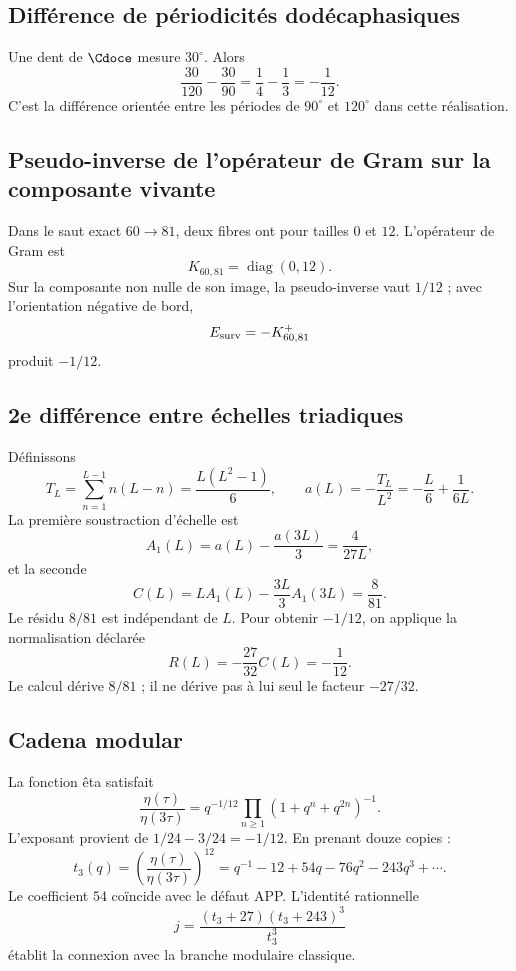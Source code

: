 \subsection{Différence de périodicités dodécaphasiques}

Une dent de \(\Cdoce\) mesure \(30^\circ\). Alors
\[
\frac{30}{120}-\frac{30}{90}
=\frac14-\frac13
=-\frac1{12}.
\]
C’est la différence orientée entre les périodes de \(90^\circ\) et
\(120^\circ\) dans cette réalisation.

\subsection{Pseudo-inverse de l’opérateur de Gram sur la composante vivante}

Dans le saut exact \(60\to81\), deux fibres ont pour tailles \(0\) et
\(12\). L’opérateur de Gram est
\[
K_{60,81}=\operatorname{diag}(0,12).
\]
Sur la composante non nulle de son image, la pseudo-inverse vaut \(1/12\) ; avec l’orientation
négative de bord,
\[
E_{\rm surv}=-K_{60,81}^{+}
\]
produit \(-1/12\).

\subsection{2e différence entre échelles triadiques}
\label{sec:c27-segunda-diferencia-triadica}

Définissons
\[
T_L=\sum_{n=1}^{L-1}n(L-n)=\frac{L(L^2-1)}6,
\qquad
a(L)=-\frac{T_L}{L^2}=-\frac L6+\frac1{6L}.
\]
La première soustraction d’échelle est
\[
A_1(L)=a(L)-\frac{a(3L)}3=\frac4{27L},
\]
et la seconde
\[
C(L)=LA_1(L)-\frac{3L}{3}A_1(3L)=\frac8{81}.
\]
Le résidu \(8/81\) est indépendant de \(L\). Pour obtenir
\(-1/12\), on applique la normalisation déclarée
\[
R(L)=-\frac{27}{32}C(L)=-\frac1{12}.
\]
Le calcul dérive \(8/81\) ; il ne dérive pas à lui seul le facteur \(-27/32\).

\subsection{Cadena modular}

La fonction êta satisfait
\[
\frac{\eta(\tau)}{\eta(3\tau)}
=q^{-1/12}\prod_{n\ge1}(1+q^n+q^{2n})^{-1}.
\]
L’exposant provient de \(1/24-3/24=-1/12\). En prenant douze copies :
\[
t_3(q)=\left(\frac{\eta(\tau)}{\eta(3\tau)}\right)^{12}
=q^{-1}-12+54q-76q^2-243q^3+\cdots.
\]
Le coefficient \(54\) coïncide avec le défaut APP\@. L’identité rationnelle
\[
j=\frac{(t_3+27)(t_3+243)^3}{t_3^3}
\]
établit la connexion avec la branche modulaire classique.

